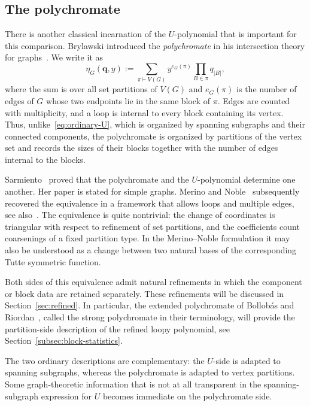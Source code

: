 \documentclass[11pt]{article}
\theoremstyle{plain}
\theoremstyle{definition}
\newcommand{\bq}{\mathbf{q}}
\numberwithin{equation}{section}
\begin{document}
\subsection{The polychromate}\label{subsec:polychromate}

There is another classical incarnation of the $U$-polynomial that is important for this comparison.
Brylawski introduced the \emph{polychromate} in his intersection theory for graphs~\cite{Bry}.  We write it as
\begin{equation}\label{eq:polychromate}
   \eta_G(\bq,y)
   :=
   \sum_{\pi\vdash V(G)}
   y^{e_G(\pi)}
   \prod_{B\in\pi}q_{|B|},
\end{equation}
where the sum is over all set partitions of $V(G)$ and $e_G(\pi)$ is the
number of edges of $G$ whose two endpoints lie in the same block of $\pi$.
Edges are counted with multiplicity, and a loop is internal to every block
containing its vertex.  Thus, unlike~\eqref{eq:ordinary-U}, which is organized
by spanning subgraphs and their connected components, the polychromate is
organized by partitions of the vertex set and records the sizes of their
blocks together with the number of edges internal to the blocks.

Sarmiento~\cite{Sar} proved that the polychromate and the $U$-polynomial determine one another.
Her paper is stated for simple graphs.  Merino and Noble~\cite{MN}
subsequently recovered the equivalence in a framework that
allows loops and multiple edges, see also~\cite{Nob}.  The equivalence is quite nontrivial: the
change of coordinates is triangular with respect to refinement of set
partitions, and the coefficients count coarsenings of a fixed partition type.
In the Merino--Noble formulation it may also be understood as a change
between two natural bases of the corresponding Tutte symmetric function.

Both sides of this equivalence admit natural refinements in which the
component or block data are retained separately.  These refinements will
be discussed in Section~\ref{sec:refined}.  In particular, the extended
polychromate of Bollob\'as and Riordan~\cite{BR}, called the strong
polychromate in their terminology, will provide the partition-side
description of the refined loopy polynomial, see
Section~\ref{subsec:block-statistics}.

The two ordinary descriptions are complementary: the $U$-side is adapted
to spanning subgraphs, whereas the polychromate is adapted to vertex
partitions.  Some graph-theoretic information that is not at all
transparent in the spanning-subgraph expression for $U$ becomes immediate
on the polychromate side.
\end{document}
